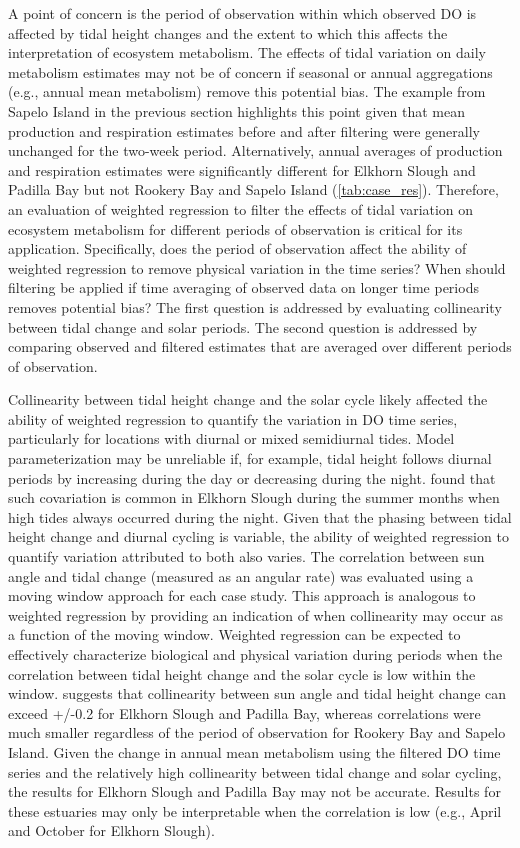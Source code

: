 \documentclass[letterpaper,12pt,oneside]{article}\usepackage[]{graphicx}\usepackage[]{color}
\begin{document}
A point of concern is the period of observation within which observed \ac{DO} is affected by tidal height changes and the extent to which this affects the interpretation of ecosystem metabolism.  The effects of tidal variation on daily metabolism estimates may not be of concern if seasonal or annual aggregations (e.g., annual mean metabolism) remove this potential bias.  The example from Sapelo Island in the previous section highlights this point given that mean production and respiration estimates before and after filtering were generally unchanged for the two-week period. Alternatively, annual averages of production and respiration estimates were significantly different for Elkhorn Slough and Padilla Bay but not Rookery Bay and Sapelo Island (\cref{tab:case_res}).  Therefore, an evaluation of weighted regression to filter the effects of tidal variation on ecosystem metabolism for different periods of observation is critical for its application.  Specifically, does the period of observation affect the ability of weighted regression to remove physical variation in the time series?  When should filtering be applied if time averaging of observed data on longer time periods removes potential bias?  The first question is addressed by evaluating collinearity between tidal change and solar periods.  The second question is addressed by comparing observed and filtered estimates that are averaged over different periods of observation.

Collinearity between tidal height change and the solar cycle likely affected the ability of weighted regression to quantify the variation in \ac{DO} time series, particularly for locations with diurnal or mixed semidiurnal tides.  Model parameterization may be unreliable if, for example, tidal height follows diurnal periods by increasing during the day or decreasing during the night.  \citet{Nidzieko14} found that such covariation is common in Elkhorn Slough during the summer months when high tides always occurred during the night.  Given that the phasing between tidal height change and diurnal cycling is variable, the ability of weighted regression to quantify variation attributed to both also varies.   The correlation between sun angle and tidal change (measured as an angular rate) was evaluated using a moving window approach for each case study.  This approach is analogous to weighted regression by providing an indication of when collinearity may occur as a function of the moving window.  Weighted regression can be expected to effectively characterize biological and physical variation during periods when the correlation between tidal height change and the solar cycle is low within the window.   suggests that collinearity between sun angle and tidal height change can exceed +/-0.2 for Elkhorn Slough and Padilla Bay, whereas correlations were much smaller regardless of the period of observation for Rookery Bay and Sapelo Island.  Given the change in annual mean metabolism using the filtered \ac{DO} time series and the relatively high collinearity between tidal change and solar cycling, the results for Elkhorn Slough and Padilla Bay may not be accurate.  Results for these estuaries may only be interpretable when the correlation is low (e.g., April and October for Elkhorn Slough). 
\end{document}
